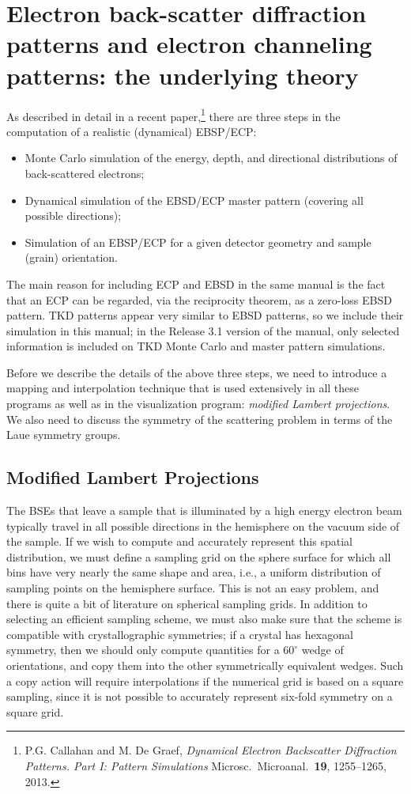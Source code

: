 \documentclass[DIV=calc, paper=letter, fontsize=11pt]{scrartcl}	 %
\begin{document}
\newpage
\section{Electron back-scatter diffraction patterns and electron channeling patterns: the underlying theory\label{sec:theory}}
As described in detail in a recent paper,\footnote{P.G. Callahan and M. De Graef, \textit{Dynamical Electron Backscatter Diffraction Patterns. Part I: Pattern Simulations}
Microsc.\ Microanal.\ \textbf{19}, 1255--1265, 2013.} there are three steps in the computation of a realistic (dynamical) EBSP/ECP:
\begin{itemize}
	\item Monte Carlo simulation of the energy, depth, and directional distributions of back-scattered electrons;
	\item Dynamical simulation of the EBSD/ECP master pattern (covering all possible directions);
	\item Simulation of an EBSP/ECP for a given detector geometry and sample (grain) orientation.
\end{itemize}
The main reason for including ECP and EBSD in the same manual is the fact that an ECP can be regarded, via the reciprocity theorem, as a zero-loss EBSD pattern.
TKD patterns appear very similar to EBSD patterns, so we include their simulation in this manual; in the Release 3.1 version of the manual, only selected information is included
on TKD Monte Carlo and master pattern simulations.

Before we describe the details of the above three steps, we need to introduce a mapping and interpolation technique that is used extensively in all
these programs as well as in the visualization program: \textit{modified Lambert projections}.  We also need to discuss the 
symmetry of the scattering problem in terms of the Laue symmetry groups. 

\subsection{Modified Lambert Projections \label{sec:Lambert}}
The BSEs that leave a sample that is illuminated by a high energy electron beam typically travel in all possible directions in the hemisphere
on the vacuum side of the sample.  If we wish to compute and accurately represent this spatial distribution, we must define a sampling grid 
on the sphere surface for which all bins have very nearly the same shape and area, i.e., a uniform distribution of sampling points 
on the hemisphere surface.  This is not an easy problem, and there is quite a bit of literature on spherical sampling grids.  In addition 
to selecting an efficient sampling scheme, we must also make sure that the scheme is compatible with crystallographic symmetries; if a crystal
has hexagonal symmetry, then we should only compute quantities for a $60^{\circ}$ wedge of orientations, and copy them into the other symmetrically
equivalent wedges.  Such a copy action will require interpolations if the numerical grid is based on a square sampling, since it is not possible
to accurately represent six-fold symmetry on a square grid.  
\end{document}
